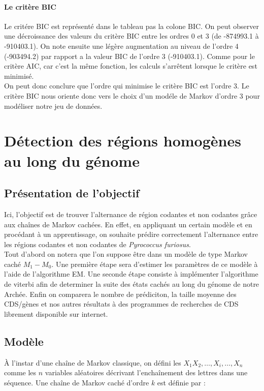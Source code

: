 \documentclass[12pt,a4paper]{article}
\begin{document}
\paragraph{Le critère BIC}
Le critére BIC est représenté dans le tableau pas la colone BIC. On peut observer une décroissance des valeurs du critère BIC entre les ordres 0 et 3 (de -874993.1 à -910403.1). On note ensuite une légère augmentation au niveau de l'ordre 4 (-903494.2) par rapport a la valeur BIC de l'ordre 3 (-910403.1). Comme pour le critère AIC, car c'est la même fonction, les calculs s'arrêtent lorsque le critère est minimisé.
\\ \indent
On peut donc conclure que l'ordre qui minimise le critère BIC est l'ordre 3. Le critère BIC nous oriente donc vers le choix d'un modéle de Markov d'ordre 3 pour modéliser notre jeu de données.

\section{Détection des régions homogènes au long du génome}
\subsection{Présentation de l'objectif}
Ici, l'objectif est de trouver l'alternance de région codantes et non codantes grâce aux chaînes de Markov cachées. En effet, en appliquant un certain modèle et en procédant à un apprentissage, on souhaite prédire correctement l'alternance entre les régions codantes et non codantes de \textit{Pyrococcus furiosus}.
\\ \indent
Tout d'abord on notera que l'on suppose être dans un modèle de type Markov caché $M_1-M_0$. 
Une première étape sera d'estimer les paramètres de ce modèle à l'aide de l'algorithme EM. 
Une seconde étape consiste à implémenter l'algorithme de viterbi afin de determiner la suite des états cachés au long du génome de notre Archée. 
Enfin on comparera le nombre de prédiciton, la taille moyenne des CDS/gènes et nos autres résultats à des programmes de recherches de CDS librement disponible sur internet.



\subsection{Modèle}

À l'instar d'une chaîne de Markov classique, on défini les $X_1X_2, \dots, X_i, \dots, X_n$ comme les $n$ variables aléatoires décrivant l'enchaînement des lettres dans une séquence.
Une chaîne de Markov caché d'ordre $k$ est définie par :
\end{document}
